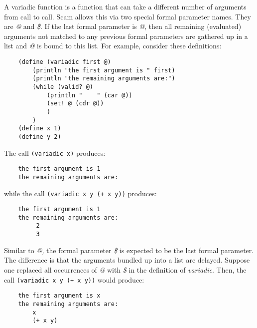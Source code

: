 A variadic function is a function that can take a different
number of arguments from call to call.
Scam allows this via two special formal parameter names.
They are {\it @} and {\it \$}.
If the last formal parameter is {\it @}, then all remaining
(evaluated) arguments not matched to any previous formal
parameters are gathered up in a list and {\it @} is bound to this
list.  For example, consider these definitions:

\begin{verbatim}
    (define (variadic first @)
        (println "the first argument is " first)
        (println "the remaining arguments are:")
        (while (valid? @)
            (println "    " (car @))
            (set! @ (cdr @))
            )
        )
    (define x 1)
    (define y 2)
\end{verbatim}

The call \verb!(variadic x)! produces:

\begin{verbatim}
    the first argument is 1
    the remaining arguments are:
\end{verbatim}

while the call \verb!(variadic x y (+ x y))! produces:

\begin{verbatim}
    the first argument is 1
    the remaining arguments are:
         2
         3
\end{verbatim}

Similar to {\it @,} the formal parameter {\it \$} is expected to be the
last formal parameter. The difference is that the arguments
bundled up into a list
are delayed. Suppose one replaced all occurrences of {\it @} with
{\it \$} in the definition of {\it variadic}.
Then, the call \verb!(variadic x y (+ x y))! would produce:

\begin{verbatim}
    the first argument is x
    the remaining arguments are:
        x
        (+ x y)
\end{verbatim}
